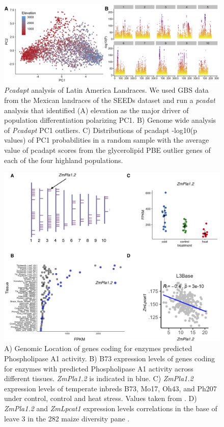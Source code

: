 \documentclass[9pt,twocolumn,twoside,lineno]{gsajnl}
\begin{document}
\begin{figure}[t]
\begin{center}
\includegraphics[width=0.8\paperwidth]{Sup_Figures/Sup_Fig_2.png}
\caption{\textit{Pcadapt} analysis of Latin America Landraces. We used GBS data from the Mexican landraces of the SEEDs dataset \citep{Romero_Navarro2017-cn} and run a \textit{pcadat} analysis \citep{Luu2017-ws} that identified (A) elevation as the major driver of population differentiation polarizing PC1.  
B) Genome wide analysis of \textit{Pcadapt} PC1 outliers. 
C) Distributions of pcadapt -log10(p values) of PC1 probabilities in a random sample with the average value of pcadapt scores from the glycerolipid PBE outlier genes of each of the four highland populations. 
}
\label{SupFig2}
\end{center}
\end{figure} 

\begin{figure}[t]
\begin{center}
\includegraphics[width=0.8\paperwidth]{Sup_Figures/Sup_Fig_3.png}
\caption{A) Genomic Location of genes coding for enzymes predicted Phospholipase A1 activity. B) B73 expression levels of genes coding for enzymes with predicted Phospholipase A1 activity across different tissues. \textit{ZmPla1.2} is indicated in blue. C) \textit{ZmPla1.2} expression levels of temperate inbreds B73, Mo17, Oh43, and Ph207 under control, control and heat stress. Values taken from \cite{Waters2017-nat}. D) \textit{ZmPla1.2} and \textit{ZmLpcat1} expression levels correlations in the base of leave 3 in the 282 maize diversity pane \cite{Kremling2018-gn}. 
}
\label{SupFig3}
\end{center}
\end{figure}  
\end{document}
